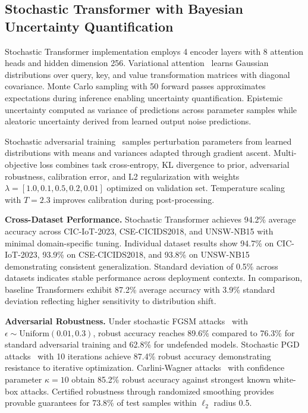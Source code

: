 \subsection{Stochastic Transformer with Bayesian Uncertainty Quantification}

Stochastic Transformer implementation employs 4 encoder layers with 8 attention heads and hidden dimension 256. Variational attention~\cite{blundell2015weight} learns Gaussian distributions over query, key, and value transformation matrices with diagonal covariance. Monte Carlo sampling with 50 forward passes approximates expectations during inference enabling uncertainty quantification. Epistemic uncertainty computed as variance of predictions across parameter samples while aleatoric uncertainty derived from learned output noise predictions.

Stochastic adversarial training~\cite{madry2018towards} samples perturbation parameters from learned distributions with means and variances adapted through gradient ascent. Multi-objective loss combines task cross-entropy, KL divergence to prior, adversarial robustness, calibration error, and L2 regularization with weights $\lambda = [1.0, 0.1, 0.5, 0.2, 0.01]$ optimized on validation set. Temperature scaling~\cite{guo2017calibration} with $T = 2.3$ improves calibration during post-processing.

\textbf{Cross-Dataset Performance.} Stochastic Transformer achieves 94.2\% average accuracy across CIC-IoT-2023, CSE-CICIDS2018, and UNSW-NB15 with minimal domain-specific tuning. Individual dataset results show 94.7\% on CIC-IoT-2023, 93.9\% on CSE-CICIDS2018, and 93.8\% on UNSW-NB15 demonstrating consistent generalization. Standard deviation of 0.5\% across datasets indicates stable performance across deployment contexts. In comparison, baseline Transformers exhibit 87.2\% average accuracy with 3.9\% standard deviation reflecting higher sensitivity to distribution shift.

\textbf{Adversarial Robustness.} Under stochastic FGSM attacks~\cite{goodfellow2015explaining} with $\epsilon \sim \text{Uniform}(0.01, 0.3)$, robust accuracy reaches 89.6\% compared to 76.3\% for standard adversarial training and 62.8\% for undefended models. Stochastic PGD attacks~\cite{madry2018towards} with 10 iterations achieve 87.4\% robust accuracy demonstrating resistance to iterative optimization. Carlini-Wagner attacks~\cite{carlini2017towards} with confidence parameter $\kappa = 10$ obtain 85.2\% robust accuracy against strongest known white-box attacks. Certified robustness through randomized smoothing provides provable guarantees for 73.8\% of test samples within $\ell_2$ radius 0.5.

